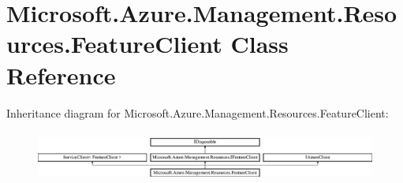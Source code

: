 \hypertarget{class_microsoft_1_1_azure_1_1_management_1_1_resources_1_1_feature_client}{}\section{Microsoft.\+Azure.\+Management.\+Resources.\+Feature\+Client Class Reference}
\label{class_microsoft_1_1_azure_1_1_management_1_1_resources_1_1_feature_client}


 


Inheritance diagram for Microsoft.\+Azure.\+Management.\+Resources.\+Feature\+Client\+:\begin{figure}[H]
\begin{center}
\leavevmode
\includegraphics[height=1.676647cm]{class_microsoft_1_1_azure_1_1_management_1_1_resources_1_1_feature_client}
\end{center}
\end{figure}
